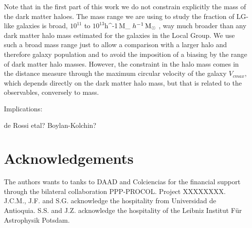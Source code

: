 \documentclass[useAMS,usenatbib]{mn2e}
\def \hMsun {\ifmmode h^{-1}\,\rm M_{\odot} \else $h^{-1}\,\rm M_{\odot}$ \fi}
\begin{document}
Note that in the first part of this work we do not constrain
explicitly the mass of the dark matter haloes. The mass range we are
using to study the fraction of LG-like galaxies is broad, $10^{11}$ to
$10^{13}$\hMsun, way much broader than any dark matter halo mass
estimated for the galaxies in the Local Group. We use such a broad
mass range just to allow a comparison with a larger halo and therefore
galaxy population and to avoid the imposition of a biasing by the
range of dark matter halo masses. However, the constraint in the halo
mass comes in the distance measure through the maximum circular
velocity of the galaxy $V_{cmax}$, which depends directly on the dark
matter halo mass, but that is related to the observables, conversely
to mass.

Implications:

de Rossi etal?
Boylan-Kolchin?


\section*{Acknowledgements}

The authors wants to tanks to DAAD and Colciencias for the financial
support through the bilateral collaboration PPP-PROCOL. Project
XXXXXXXX. J.C.M., J.F. and S.G. acknowledge the hospitality from
Universidad de Antioquia. S.S. and J.Z. acknowledge the hospitality
of the Leibniz Institut F\"{u}r Astrophysik Potsdam.



\begin{thebibliography}{99}


  
\end{thebibliography}


\bsp

\label{lastpage}
\end{document}
